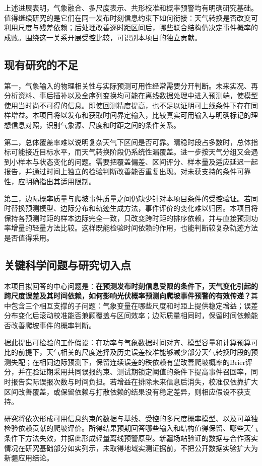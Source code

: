 上述进展表明，气象融合、多尺度表示、共形校准和概率预警均有明确研究基础。值得继续研究的是它们在同一发布时刻信息约束下如何衔接：天气转换是否改变可利用尺度与残差依赖；后处理改善逐时距区间后，哪些联合结构仍决定事件概率的成败。围绕这一关系开展受控比较，可识别本项目的独立贡献。

\subsection{现有研究的不足}
第一，气象输入的物理相关性与实际预测可用性经常需要分开判断。未来实况、再分析资料、事后插补以及全序列变换均可能在离线数据处理中进入预测端，使模型使用当时尚不可得的信息。即使回测精度提高，也不足以证明可上线条件下存在同样增益。本项目将以发布和获取时间界定输入，比较真实可用输入与明确标记的理想信息对照，识别气象源、尺度和时距之间的条件关系。

第二，总体覆盖率难以说明复杂天气下区间是否可靠。晴稳时段占多数时，总体指标可能接近目标水平，而天气转换阶段仍系统性漏覆盖。进一步按天气分组又会遇到小样本与状态变化的问题。需要把覆盖偏差、区间评分、样本量及适应延迟一起报告，并通过时间上独立的检验判断改善能否重复出现。对未获支持的条件可靠性，应明确指出其适用限制。

第三，边际概率质量与爬坡事件质量之间仍缺少针对本项目条件的受控验证。若同时替换预测模型、边际分布和轨迹生成方法，事件评价的变化难以归因。本项目将保持各预测时距的样本边际完全一致，只改变跨时距的排序依赖，并与直接预测功率增量的轻量方法比较。这样既能检验时间依赖的作用，也能判断较复杂轨迹方法是否值得采用。

\subsection{关键科学问题与研究切入点}
本项目拟回答的中心问题是：\textbf{在预测发布时刻信息受限的条件下，天气变化引起的跨尺度误差及其时间依赖，如何影响光伏概率预测向爬坡事件预警的有效传递？}其中包含三个相互支撑的子问题：气象变量在哪些尺度和时距上提供稳定增益；误差分布变化后滚动校准能否兼顾覆盖与区间效率；边际质量相同时，保留时间依赖能否改善爬坡事件的概率判断。

据此提出可检验的工作假设：在功率与气象数据时间对齐、模型容量和计算预算可比的前提下，天气相关的尺度选择及历史误差校准能够减少部分天气转换时段的预测失配；在相同边际预测下，保留连续误差的秩依赖有望改善爬坡概率的Brier评分，并在验证期采用共同误报约束、测试期锁定阈值的条件下提高事件召回率，同时报告实际误报次数与时间负担。若增益在排除未来信息后消失，校准仅依靠扩大区间改善覆盖，或保留依赖与打散依赖的结果没有稳定差异，则相应假设不获支持。

研究将依次形成可用信息约束的数据与基线、受控的多尺度概率模型、以及可单独检验依赖贡献的爬坡评价。所得结果预期回答哪些输入和结构值得保留、哪些天气条件下方法失效，并据此形成轻量离线预警原型。新疆场站验证的数据与合作落实情况在研究基础部分如实列示，未取得地域实测证据前，不把公开数据实验扩大为新疆应用结论。
